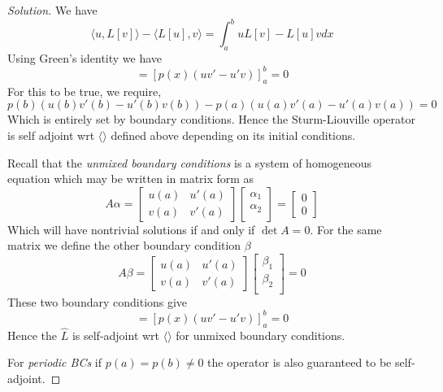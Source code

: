 \begin{proof}[Solution]
  We have 
  \[\langle u,L[v] \rangle -\langle L[u],v \rangle = \int_a^b uL[v]-L[u]v dx\]
  Using Green's identity we have 
  \[=\left[ p(x)(uv'-u'v) \right]_a^b =0\]
  For this to be true, we require,
  \[ p(b)(u(b)v'(b)-u'(b)v(b))- p(a)(u(a)v'(a)-u'(a)v(a))=0\]
  Which is entirely set by boundary conditions. Hence the Sturm-Liouville operator is self
  adjoint wrt $\langle  \rangle $ defined above depending on its initial conditions.

  Recall that the \emph{unmixed boundary conditions} is a system of homogeneous equation which may be
  written in matrix form as 
  \[ A \alpha =
    \begin{bmatrix}
      u(a) & u'(a) \\
      v(a) & v'(a) 
    \end{bmatrix}
    \begin{bmatrix}
      \alpha_1\\
      \alpha_2\\
    \end{bmatrix} = 
    \begin{bmatrix}
      0\\0
    \end{bmatrix}
  \]
  Which will have nontrivial solutions if and only if $\det A=0$. For the same matrix we
  define the other boundary condition $\beta$ 
  \[ A\beta=
    \begin{bmatrix}
      u(a) & u'(a) \\
      v(a) & v'(a) 
    \end{bmatrix}
    \begin{bmatrix}
      \beta_1\\
      \beta_2\\
    \end{bmatrix} =  0
  \]
  These two boundary conditions give 
  \[=\left[ p(x)(uv'-u'v) \right]_a^b =0\]
  Hence the $\hat{L}$ is self-adjoint wrt $\langle  \rangle$ for unmixed boundary
  conditions.

  For \emph{periodic BCs} if $p(a)=p(b)\neq 0$ the operator is also guaranteed to be
  self-adjoint.
\end{proof}

